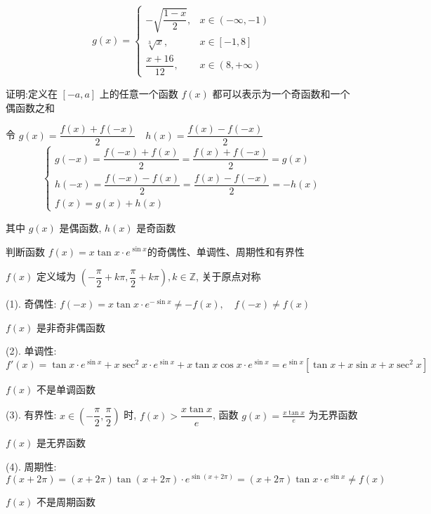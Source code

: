 \begin{solution}
	$$
	g(x) = 
	\begin{cases}
		-\sqrt{\dfrac{1-x}{2}}, & x\in(-\infty,-1)\\
		\displaystyle{\sqrt[3]{x}}, & x\in[-1,8]\\
		\dfrac{x+16}{12}, & x\in(8,+\infty)
	\end{cases}
	$$
\end{solution}

\begin{example}[][Exam: 27.1.5]
	证明:定义在 $[-a,a]$ 上的任意一个函数 $f(x)$ 都可以表示为一个奇函数和一个偶函数之和
\end{example}

\begin{solution}

	令 $g(x)= \dfrac{f(x)+f(-x)}{2}\quad h(x)=\dfrac{f(x)-f(-x)}{2}$
	$$
	\begin{cases}
		g(-x)=\dfrac{f(-x)+f(x)}{2}=\dfrac{f(x)+f(-x)}{2}=g(x)\\
		h(-x)=\dfrac{f(-x)-f(x)}{2}=\dfrac{f(x)-f(-x)}{2}=-h(x)\\
		f(x) = g(x)+h(x)
	\end{cases}
	$$
	
	其中 $g(x)$ 是偶函数, $h(x)$ 是奇函数
\end{solution}

\begin{example}[][Exam: 27.1.6]
	判断函数 $f(x)=x\tan x\cdot e^{\sin x}$的奇偶性、单调性、周期性和有界性
\end{example}

\begin{solution}

	$f(x)$ 定义域为 $(-\dfrac{\pi}{2}+k\pi,\dfrac{\pi}{2}+k\pi),k\in \mathbb{Z}$, 关于原点对称
	
	(1). 奇偶性: $f(-x) = x\tan x\cdot e^{-\sin x}\neq -f(x),\quad f(-x)\neq f(x)$

	$f(x)$ 是非奇非偶函数

	(2). 单调性: $f'(x) = \tan x\cdot e^{\sin x}+x\sec^{2}x\cdot e^{\sin x}+x\tan x\cos x\cdot e^{\sin x}=e^{\sin x}\left[\tan x+x\sin x+x\sec^{2}x\right]$

	$f(x)$ 不是单调函数

	(3). 有界性: $x\in(-\dfrac{\pi}{2},\dfrac{\pi}{2})$ 时, $f(x) > \dfrac{x\tan x}{e}$, 函数 $g(x)=\frac{x\tan x}{e}$ 为无界函数

	$f(x)$ 是无界函数

	(4). 周期性: $f(x+2\pi) = (x+2\pi)\tan(x+2\pi)\cdot e^{\sin(x+2\pi)} = (x+2\pi)\tan x\cdot e^{\sin x} \neq f(x)$

	$f(x)$ 不是周期函数
\end{solution}

